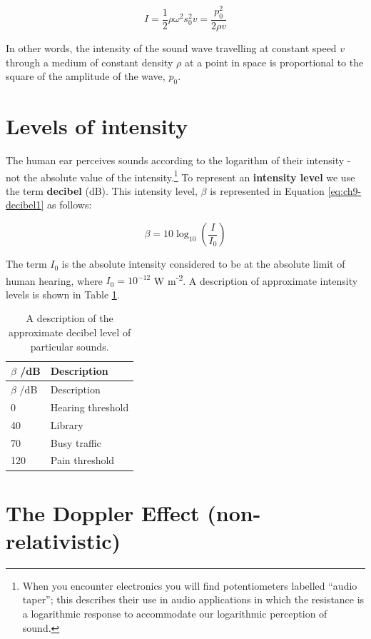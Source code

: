 \documentclass[
]{book}
\begin{document}
\begin{equation}
I = \frac{1}{2}\rho \omega^2 s_0^2 v = \frac{p_0^2}{2\rho v}
\label{eq:ch9-waveintensity3}
\end{equation}

In other words, the intensity of the sound wave travelling at constant speed \(v\) through a medium of constant density \(\rho\) at a point in space is proportional to the square of the amplitude of the wave, \(p_0\).

\hypertarget{sec:ch9-intensitylevels}{%
\section{Levels of intensity}\label{sec:ch9-intensitylevels}}

The human ear perceives sounds according to the logarithm of their intensity - not the absolute value of the intensity.\footnote{When you encounter electronics you will find potentiometers labelled ``audio taper''; this describes their use in audio applications in which the resistance is a logarithmic response to accommodate our logarithmic perception of sound.} To represent an \textbf{intensity level} we use the term \textbf{decibel} (dB). This intensity level, \(\beta\) is represented in Equation \eqref{eq:ch9-decibel1} as follows:

\begin{equation}
\beta = 10 \log_{10}\left(\frac{I}{I_0}\right)
\label{eq:ch9-decibel1}
\end{equation}

The term \(I_0\) is the absolute intensity considered to be at the absolute limit of human hearing, where \(I_0 = 10^{-12}\) W m\textsuperscript{-2}. A description of approximate intensity levels is shown in Table \ref{tab:ch9-decibeldescription1}.

\begin{longtable}[]{@{}ll@{}}
\caption{\label{tab:ch9-decibeldescription1} A description of the approximate decibel level of particular sounds.}\tabularnewline
\toprule
\(\beta\) /dB & Description\tabularnewline
\midrule
\endfirsthead
\toprule
\(\beta\) /dB & Description\tabularnewline
\midrule
\endhead
0 & Hearing threshold\tabularnewline
40 & Library\tabularnewline
70 & Busy traffic\tabularnewline
120 & Pain threshold\tabularnewline
\bottomrule
\end{longtable}

\hypertarget{sec:ch9-dopplereffect1}{%
\section{The Doppler Effect (non-relativistic)}\label{sec:ch9-dopplereffect1}}
\end{document}
